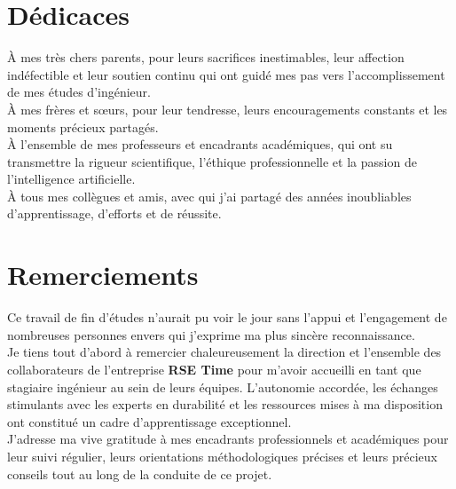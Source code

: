 \documentclass[12pt,a4paper]{report}
\begin{document}

\chapter*{Dédicaces}

À mes très chers parents, pour leurs sacrifices inestimables, leur affection indéfectible et leur soutien continu qui ont guidé mes pas vers l'accomplissement de mes études d'ingénieur.\\

À mes frères et sœurs, pour leur tendresse, leurs encouragements constants et les moments précieux partagés.\\

À l'ensemble de mes professeurs et encadrants académiques, qui ont su transmettre la rigueur scientifique, l'éthique professionnelle et la passion de l'intelligence artificielle.\\

À tous mes collègues et amis, avec qui j'ai partagé des années inoubliables d'apprentissage, d'efforts et de réussite.

\newpage

\chapter*{Remerciements}

Ce travail de fin d'études n'aurait pu voir le jour sans l'appui et l'engagement de nombreuses personnes envers qui j'exprime ma plus sincère reconnaissance.\\

Je tiens tout d'abord à remercier chaleureusement la direction et l'ensemble des collaborateurs de l'entreprise \textbf{RSE Time} pour m'avoir accueilli en tant que stagiaire ingénieur au sein de leurs équipes. L'autonomie accordée, les échanges stimulants avec les experts en durabilité et les ressources mises à ma disposition ont constitué un cadre d'apprentissage exceptionnel.\\

J'adresse ma vive gratitude à mes encadrants professionnels et académiques pour leur suivi régulier, leurs orientations méthodologiques précises et leurs précieux conseils tout au long de la conduite de ce projet.\\
\end{document}
